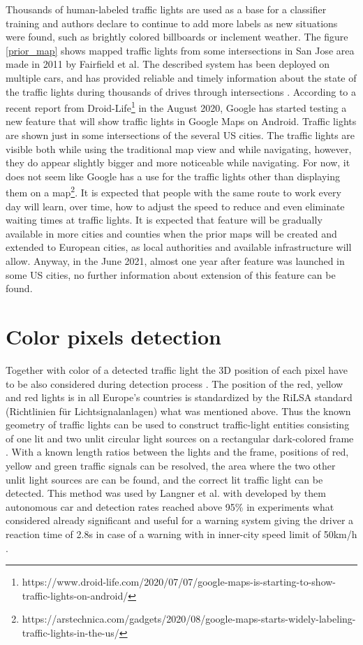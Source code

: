 \documentclass[letterpaper, 10 pt, conference]{ieeeconf} %
\begin{document}
Thousands of human-labeled traffic lights are used as a base for a classifier training and authors declare to continue to add more labels as new situations were found, such as brightly colored billboards or inclement weather. The figure \ref*{prior_map} shows mapped traffic lights from some intersections in San Jose area made in 2011 by Fairfield et al. The described system has been deployed on multiple cars, and has provided reliable and timely information about the state of the traffic lights during thousands of drives through intersections \cite{c5}. According to a recent report from Droid-Life\footnote{https://www.droid-life.com/2020/07/07/google-maps-is-starting-to-show-traffic-lights-on-android/} in the August 2020, Google has started testing a new feature that will show traffic lights in Google Maps on Android. Traffic lights are shown just in some intersections of the several US cities. The traffic lights are visible both while using the traditional map view and while navigating, however, they do appear slightly bigger and more noticeable while navigating. For now, it does not seem like Google has a use for the traffic lights other than displaying them on a map\footnote{https://arstechnica.com/gadgets/2020/08/google-maps-starts-widely-labeling-traffic-lights-in-the-us/}. It is expected that people with the same route to work every day will learn, over time, how to adjust the speed to reduce and even eliminate waiting times at traffic lights. It is expected that feature will be gradually available in more cities and counties when the prior maps will be created and extended to European cities, as local authorities and available infrastructure will allow. Anyway, in the June 2021, almost one year after feature was launched in some US cities, no further information about extension of this feature can be found. 
 
 
\section{Color pixels detection}
Together with color of a detected traffic light the 3D position of each pixel have to be also considered during detection process \cite{c4}. The position of the red, yellow and red lights is in all Europe's countries is standardized by the RiLSA standard (Richtlinien f\"ur Lichtsignalanlagen) what was mentioned above. Thus the known geometry of traffic lights can be used to construct traffic-light entities consisting of one lit and two unlit circular light sources on a rectangular dark-colored frame \cite{c4}.
With a known length ratios between the lights and the frame, positions of red, yellow and green traffic signals can be resolved, the area where the two other unlit light sources are can be found, and the correct lit traffic light can be detected. This method was used by Langner et al. with developed by them autonomous car and detection rates reached above 95\% in experiments what considered already significant and useful for a warning system giving the driver a reaction time of 2.8s in case of a warning with in inner-city speed limit of 50km/h \cite{c4}.
\end{document}
